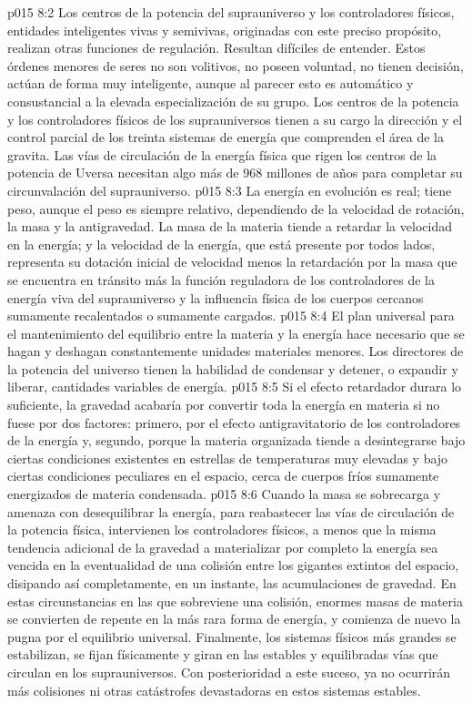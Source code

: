 \vs p015 8:2 Los centros de la potencia del suprauniverso y los controladores físicos, entidades inteligentes vivas y semivivas, originadas con este preciso propósito, realizan otras funciones de regulación. Resultan difíciles de entender. Estos órdenes menores de seres no son volitivos, no poseen voluntad, no tienen decisión, actúan de forma muy inteligente, aunque al parecer esto es automático y consustancial a la elevada especialización de su grupo. Los centros de la potencia y los controladores físicos de los suprauniversos tienen a su cargo la dirección y el control parcial de los treinta sistemas de energía que comprenden el área de la gravita. Las vías de circulación de la energía física que rigen los centros de la potencia de Uversa necesitan algo más de 968 millones de años para completar su circunvalación del suprauniverso.
\vs p015 8:3 \pc La energía en evolución es real; tiene peso, aunque el peso es siempre relativo, dependiendo de la velocidad de rotación, la masa y la antigravedad. La masa de la materia tiende a retardar la velocidad en la energía; y la velocidad de la energía, que está presente por todos lados, representa su dotación inicial de velocidad menos la retardación por la masa que se encuentra en tránsito más la función reguladora de los controladores de la energía viva del suprauniverso y la influencia física de los cuerpos cercanos sumamente recalentados o sumamente cargados.
\vs p015 8:4 El plan universal para el mantenimiento del equilibrio entre la materia y la energía hace necesario que se hagan y deshagan constantemente unidades materiales menores. Los directores de la potencia del universo tienen la habilidad de condensar y detener, o expandir y liberar, cantidades variables de energía.
\vs p015 8:5 Si el efecto retardador durara lo suficiente, la gravedad acabaría por convertir toda la energía en materia si no fuese por dos factores: primero, por el efecto antigravitatorio de los controladores de la energía y, segundo, porque la materia organizada tiende a desintegrarse bajo ciertas condiciones existentes en estrellas de temperaturas muy elevadas y bajo ciertas condiciones peculiares en el espacio, cerca de cuerpos fríos sumamente energizados de materia condensada.
\vs p015 8:6 Cuando la masa se sobrecarga y amenaza con desequilibrar la energía, para reabastecer las vías de circulación de la potencia física, intervienen los controladores físicos, a menos que la misma tendencia adicional de la gravedad a materializar por completo la energía sea vencida en la eventualidad de una colisión entre los gigantes extintos del espacio, disipando así completamente, en un instante, las acumulaciones de gravedad. En estas circunstancias en las que sobreviene una colisión, enormes masas de materia se convierten de repente en la más rara forma de energía, y comienza de nuevo la pugna por el equilibrio universal. Finalmente, los sistemas físicos más grandes se estabilizan, se fijan físicamente y giran en las estables y equilibradas vías que circulan en los suprauniversos. Con posterioridad a este suceso, ya no ocurrirán más colisiones ni otras catástrofes devastadoras en estos sistemas estables.
